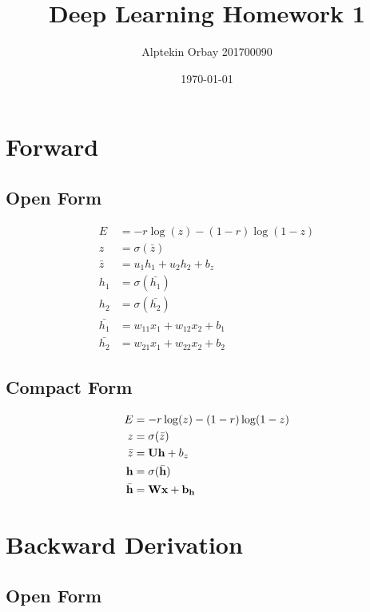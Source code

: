 \documentclass[12pt]{amsart}
\title{Deep Learning Homework 1}
\author{Alptekin Orbay 201700090}
\date{\today} %
\begin{document}
\maketitle
\tableofcontents
\newpage


\section{Forward}
\subsection{Open Form}
\begin{align*}
E &= -r\log(z)-(1-r)\log(1-z) \\
z &= \sigma(\bar{z}) \\
\bar{z} &= u_1h_1  + u_2 h_2 + b_z \\
h_1 &= \sigma(\bar{h_1}) \\
h_2 &= \sigma(\bar{h_2}) \\
\bar{h_1} &= w_{11} x_1 + w_{12} x_2 + b_1 \\
\bar{h_2} &= w_{21} x_1 + w_{22} x_2 + b_2 
\end{align*}
\subsection{Compact Form}
\begin{align*}
E &= -r\log(z)-(1-r)\log(1-z) \\
z &= \sigma(\bar{z}) \\
\bar{z} &= \bold{U}\bold{h} + b_z \\
\bold{h} &= \sigma(\bar{\bold{h}}) \\
\bar{\bold{h}} &= \bold{W} \bold{x} + \bold{b_h}
\end{align*}
\section{Backward Derivation}
\subsection{Open Form}
\end{document}
